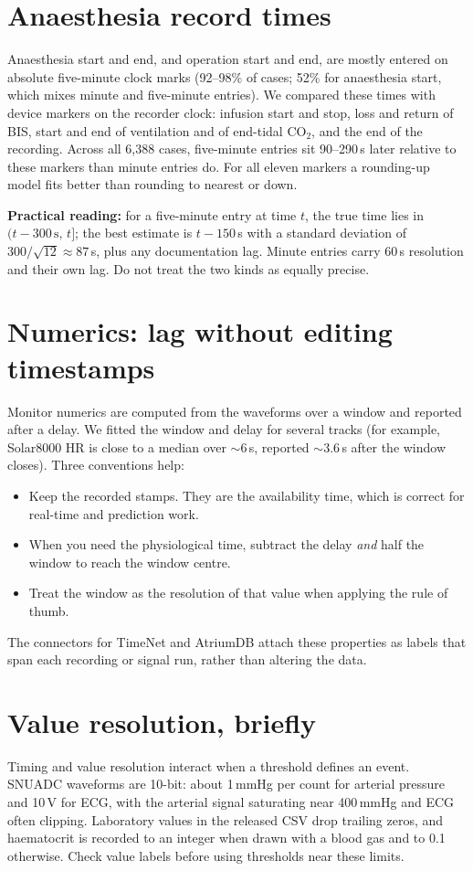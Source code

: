 \documentclass[11pt,a4paper]{article}
\begin{document}
\section{Anaesthesia record times}\label{sec:emr}
Anaesthesia start and end, and operation start and end, are mostly entered on absolute five-minute clock marks
(92--98\% of cases; 52\% for anaesthesia start, which mixes minute and five-minute entries). We compared these times
with device markers on the recorder clock: infusion start and stop, loss and return of BIS, start and end of
ventilation and of end-tidal CO$_2$, and the end of the recording. Across all 6,388 cases, five-minute entries sit
90--290\,s later relative to these markers than minute entries do. For all eleven markers a rounding-up model fits
better than rounding to nearest or down.

\textbf{Practical reading:} for a five-minute entry at time $t$, the true time lies in $(t-300\,\text{s},\,t]$;
the best estimate is $t-150$\,s with a standard deviation of $300/\sqrt{12}\approx 87$\,s, plus any documentation
lag. Minute entries carry 60\,s resolution and their own lag. Do not treat the two kinds as equally precise.

\section{Numerics: lag without editing timestamps}
Monitor numerics are computed from the waveforms over a window and reported after a delay. We fitted the window and
delay for several tracks (for example, Solar8000 HR is close to a median over $\sim$6\,s, reported
$\sim$3.6\,s after the window closes). Three conventions help:
\begin{itemize}
\item Keep the recorded stamps. They are the availability time, which is correct for real-time and prediction
work.
\item When you need the physiological time, subtract the delay \emph{and} half the window to reach the window centre.
\item Treat the window as the resolution of that value when applying the rule of thumb.
\end{itemize}
The connectors for TimeNet and AtriumDB attach these properties as labels that span each recording or signal run,
rather than altering the data.

\section{Value resolution, briefly}
Timing and value resolution interact when a threshold defines an event. SNUADC waveforms are 10-bit: about 1\,mmHg
per count for arterial pressure and 10\,\textmu V for ECG, with the arterial signal saturating near 400\,mmHg and ECG
often clipping. Laboratory values in the released CSV drop trailing zeros, and haematocrit is recorded to an integer
when drawn with a blood gas and to 0.1 otherwise. Check value labels before using thresholds near these limits.
\end{document}
